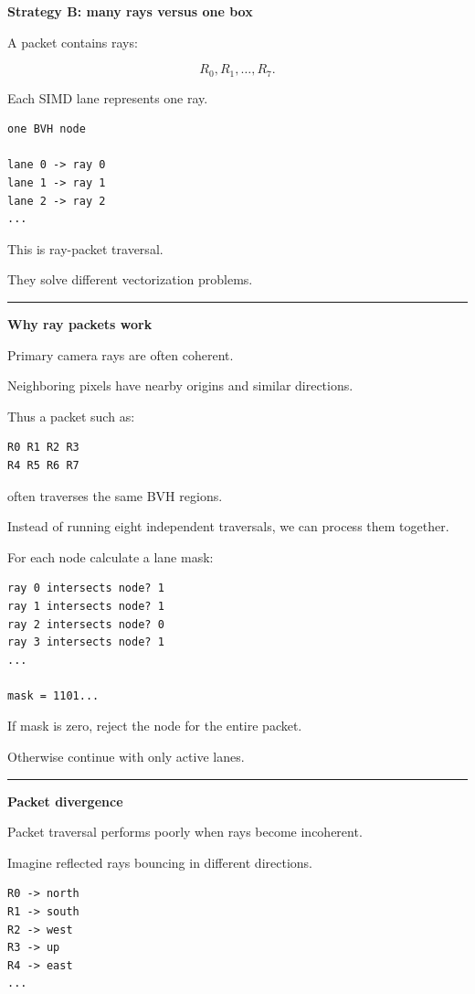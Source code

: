 \textbf{Strategy B: many rays versus one box}

A packet contains rays:

\[
R_0,R_1,\ldots,R_7.
\]

Each SIMD lane represents one ray.

\begin{verbatim}
one BVH node

lane 0 -> ray 0
lane 1 -> ray 1
lane 2 -> ray 2
...
\end{verbatim}

This is ray-packet traversal.

They solve different vectorization problems.

\begin{center}\rule{0.5\linewidth}{0.5pt}\end{center}

\textbf{Why ray packets work}

Primary camera rays are often coherent.

Neighboring pixels have nearby origins and similar directions.

Thus a packet such as:

\begin{verbatim}
R0 R1 R2 R3
R4 R5 R6 R7
\end{verbatim}

often traverses the same BVH regions.

Instead of running eight independent traversals, we can process them together.

For each node calculate a lane mask:

\begin{verbatim}
ray 0 intersects node? 1
ray 1 intersects node? 1
ray 2 intersects node? 0
ray 3 intersects node? 1
...

mask = 1101...
\end{verbatim}

If mask is zero, reject the node for the entire packet.

Otherwise continue with only active lanes.

\begin{center}\rule{0.5\linewidth}{0.5pt}\end{center}

\textbf{Packet divergence}

Packet traversal performs poorly when rays become incoherent.

Imagine reflected rays bouncing in different directions.

\begin{verbatim}
R0 -> north
R1 -> south
R2 -> west
R3 -> up
R4 -> east
...
\end{verbatim}

